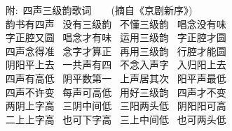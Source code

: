 {\centering
\vspace{7pt}
{\hei 
	\hspace*{-115pt}~ {\large 附:~四声三级韵歌词}}~~~~(摘自《京剧新序》)\\%
\vspace{10pt}
{\hei 
\hspace*{10pt}~ 韵书有四声~\hspace{40pt} 没有三级韵~\hspace{40pt} 不懂三级韵~\hspace{40pt} 唱念没有味\\ 
\hspace*{10pt}~ 字正腔又圆~\hspace{40pt} 唱念才有味~\hspace{40pt} 运用三级韵~\hspace{40pt} 字正腔才圆\\ 
\hspace*{10pt}~ 四声念得准~\hspace{40pt} 念字才算正~\hspace{40pt} 再用三级韵~\hspace{40pt} 行腔才能圆\\
\hspace*{10pt}~ 阴阳平上去~\hspace{40pt} 一共声有四~\hspace{40pt} 不念入声字~\hspace{40pt} 入归阳上去\\
\hspace*{10pt}~ 四声有高低~\hspace{40pt} 阴平数第一~\hspace{40pt} 上声居其次~\hspace{40pt} 阳平声最低\\
\hspace*{10pt}~ 四声不许变~\hspace{40pt} 每声可高低~\hspace{40pt} 用好三级韵~\hspace{40pt} 四声才不变\\
\hspace*{10pt}~ 两阴上字高~\hspace{40pt} 三阴中间低~\hspace{40pt} 三阳两头低~\hspace{40pt} 阴阳阳可高\\
\hspace*{10pt}~ 二上上字高~\hspace{40pt} 也可下字高~\hspace{40pt} 三上中间低~\hspace{40pt} 也可两头低\\
}}
